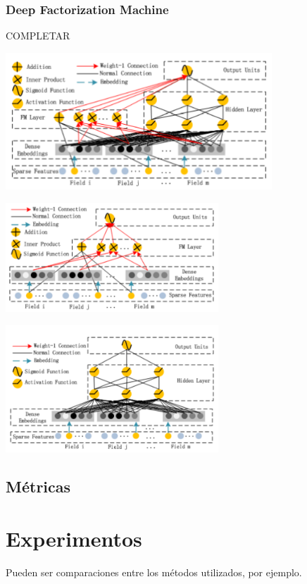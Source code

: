 \documentclass[11pt,a4paper,twoside]{thesis}
\begin{document}
\subsection{Deep Factorization Machine}

COMPLETAR

\begin{center}
	\includegraphics[width=10cm]{./images/DeepFM.png}
\end{center}


\begin{center}
	\includegraphics[width=8cm]{./images/DFM-FM-Component.png}
\end{center}

\begin{center}
	\includegraphics[width=8cm]{./images/DFM-Deep-Component.png}
\end{center}


\section{Métricas}


\chapter{Experimentos}
Pueden ser comparaciones entre los métodos utilizados, por ejemplo. 
\end{document}
